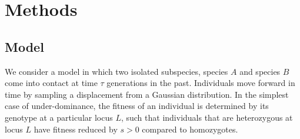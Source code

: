 \documentclass[12pt]{article}
\begin{document}




	
\section{Methods}
\subsection{Model}
We consider a model in which two isolated subspecies, species $A$ and species $B$ come into contact at time $\tau$ generations in the past. Individuals move forward in time by sampling a displacement from a Gaussian distribution. In the simplest case of under-dominance, the fitness of an individual is determined by its genotype at a particular locus $L$, such that individuals that are heterozygous at locus $L$ have fitness reduced by $s>0$ compared to homozygotes.
\end{document}
